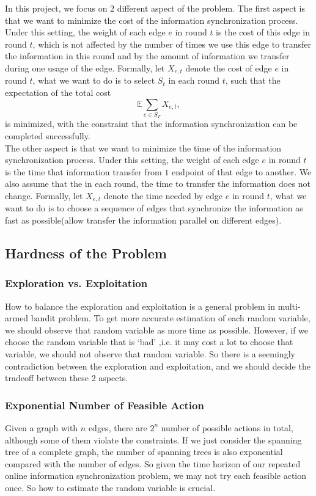 \documentclass{article}
\theoremstyle{plain}
\theoremstyle{definition}
\theoremstyle{remark}
\begin{document}
    In this project, we focus on 2 different aspect of the problem. The first aspect is that we want to minimize the cost of the information synchronization process. Under this setting, the weight of each edge $e$ in round $t$ is the cost of this edge in round $t$, which is not affected by the number of times we use this edge to transfer the information in this round and by the amount of information we transfer during one usage of the edge. Formally, let $X_{e,t}$ denote the cost of edge $e$ in round $t$, what we want to do is to select $S_t$ in each round $t$, such that the expectation of the total cost
    \[\mathbb E\sum_{e\in S_T}X_{e,t},\]
    is minimized, with the constraint that the information synchronization can be completed successfully.\\

    The other aspect is that we want to minimize the time of the information synchronization process. Under this setting, the weight of each edge $e$ in round $t$ is the time that information transfer from $1$ endpoint of that edge to another. We also assume that the in each round, the time to transfer the information does not change. Formally, let $X_{e,t}$ denote the time needed by edge $e$ in round $t$, what we want to do is to choose a sequence of edges that synchronize the information as fast as possible(allow transfer the information parallel on different edges).

    \subsection{Hardness of the Problem}
    \subsubsection{Exploration vs. Exploitation}
    How to balance the exploration and exploitation is a general problem in multi-armed bandit problem. To get more accurate estimation of each random variable, we should observe that random variable as more time as possible. However, if we choose the random variable that is `bad' ,i.e. it may cost a lot to choose that variable, we should not observe that random variable. So there is a seemingly contradiction between the exploration and exploitation, and we should decide the tradeoff between these 2 aspects.

    \subsubsection{Exponential Number of Feasible Action}
    Given a graph with $n$ edges, there are $2^n$ number of possible actions in total, although some of them violate the constraints. If we just consider the spanning tree of a complete graph, the number of spanning trees is also exponential compared with the number of edges. So given the time horizon of our repeated online information synchronization problem, we may not try each feasible action once. So how to estimate the random variable is crucial.
\end{document}
